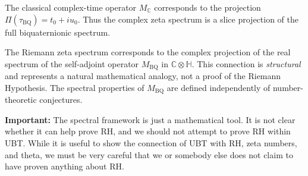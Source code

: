 \begin{remark}
The classical complex-time operator $M_{\mathbb{C}}$ corresponds
to the projection $\Pi(\tau_{\mathrm{BQ}})=t_0+i u_0$.
Thus the complex zeta spectrum is a slice projection of the full
biquaternionic spectrum.
\end{remark}

\begin{remark}
The Riemann zeta spectrum corresponds to the complex projection of the
real spectrum of the self-adjoint operator $M_{\mathrm{BQ}}$ in $\mathbb{C}\otimes\mathbb{H}$.
This connection is \emph{structural} and represents a natural mathematical analogy,
not a proof of the Riemann Hypothesis. The spectral properties of $M_{\mathrm{BQ}}$
are defined independently of number-theoretic conjectures.

\textbf{Important:} The spectral framework is just a mathematical tool. It is not clear
whether it can help prove RH, and we should not attempt to prove RH within UBT.
While it is useful to show the connection of UBT with RH, zeta numbers, and theta,
we must be very careful that we or somebody else does not claim to have proven anything about RH.
\end{remark}

